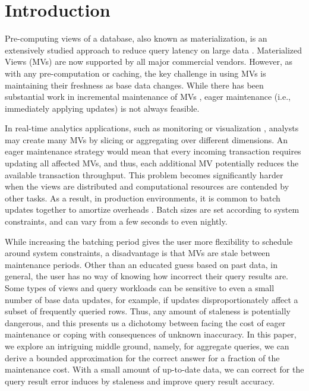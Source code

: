 \vspace{-0.5em}
\section{Introduction}
Pre-computing views of a database, also known as materialization, is an extensively studied approach to reduce query latency on large data \cite{LarsonY85, gupta1995maintenance, chirkova2011materialized}. 
Materialized Views (MVs) are now supported by all major commercial vendors.
However, as with any pre-computation or caching, the key challenge in using MVs is maintaining their freshness as base data changes.
While there has been substantial work in incremental maintenance of MVs \cite{chirkova2011materialized, DBLP:journals/vldb/KochAKNNLS14}, eager maintenance (i.e., immediately applying updates) is not always feasible.

In real-time analytics applications, such as monitoring or visualization \cite{rainbird, DBLP:journals/cgf/LiuJH13}, analysts may create many MVs by slicing or aggregating over different dimensions.
An eager maintenance strategy would mean that every incoming transaction requires updating all affected MVs, and thus, each additional MV potentially reduces the available transaction throughput.
This problem becomes significantly harder when the views are distributed and computational resources are contended by other tasks.
As a result, in production environments, it is common to batch updates together to amortize overheads \cite{chirkova2011materialized}.
Batch sizes are set according to system constraints, and can vary from a few seconds to even nightly.  

While increasing the batching period gives the user more flexibility to schedule around system constraints, a disadvantage is that MVs are stale between maintenance periods.
Other than an educated guess based on past data, in general, the user has no way of knowing how incorrect their query results are.
Some types of views and query workloads can be sensitive to even a small number of base data updates, for example, if updates disproportionately affect a subset of frequently queried rows.
Thus, any amount of staleness is potentially dangerous, and this presents us a dichotomy between facing the cost of eager maintenance or coping with consequences of unknown inaccuracy.
In this paper, we explore an intriguing middle ground, namely, for aggregate queries, we can derive a bounded approximation for the correct answer for a fraction of the maintenance cost.
With a small amount of up-to-date data, we can correct for the query result error induces by staleness and improve query result accuracy.



